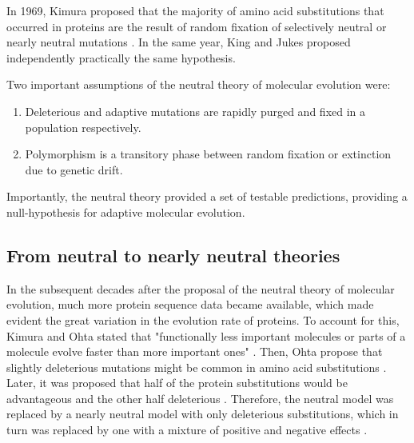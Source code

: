 In 1969, Kimura proposed that the majority of amino acid substitutions that occurred in proteins are the result of random fixation of selectively neutral or nearly neutral mutations  \citep{Kimura1969}. In the same year, King and Jukes \citep{King1969} proposed independently practically the same hypothesis.

Two important assumptions of the neutral theory of molecular evolution were:

\begin{enumerate}
\item Deleterious and adaptive mutations are rapidly purged and fixed in a population respectively.
\item Polymorphism is a transitory phase between random fixation or extinction due to genetic drift.
\end{enumerate}

Importantly, the neutral theory provided a set of testable predictions, providing a null-hypothesis for adaptive molecular evolution.

\subsection{From neutral to nearly neutral theories}

In the subsequent decades after the proposal of the neutral theory of molecular evolution, much more protein sequence data became available, which made evident the great variation in the evolution rate of proteins.
To account for this, Kimura and Ohta stated that "functionally less important molecules or parts of a molecule evolve faster than more important ones" \citep{Kimura1974}.
Then, Ohta propose that slightly deleterious mutations might be common in amino acid substitutions \citep{Ohta1973}. Later, it was proposed that half of the protein substitutions would be advantageous and the other half deleterious \citep{gillespie1994causes}.
Therefore, the neutral model was replaced by a nearly neutral model with only deleterious substitutions, which in turn was replaced by one with a mixture of positive and negative effects \citep{Ohta1996}.

